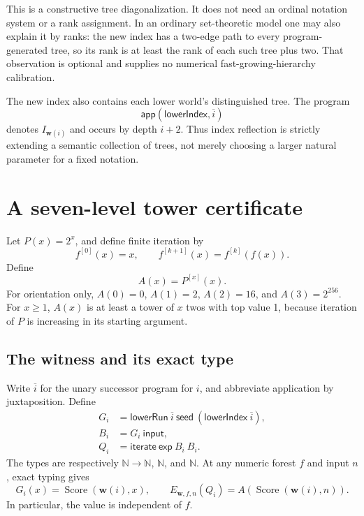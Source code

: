 \documentclass[11pt]{article}
\theoremstyle{definition}
\theoremstyle{remark}
\newcommand{\N}{\mathbb N}
\newcommand{\Score}{\operatorname{Score}}
\newcommand{\funiter}[2]{#1^{[#2]}}
\newcommand{\ctx}{\boldsymbol w}
\begin{document}
This is a constructive tree diagonalization. It does not need an ordinal
notation system or a rank assignment. In an ordinary set-theoretic model one
may also explain it by ranks: the new index has a two-edge path to every
program-generated tree, so its rank is at least the rank of each such tree
plus two. That observation is optional and supplies no numerical
fast-growing-hierarchy calibration.

The new index also contains each lower world's distinguished tree. The
program
\[
             \mathsf{app}(\mathsf{lowerIndex},\overline i)
\]
denotes $I_{\ctx(i)}$ and occurs by depth $i+2$. Thus index reflection is
strictly extending a semantic collection of trees, not merely choosing a
larger natural parameter for a fixed notation.

\section{A seven-level tower certificate}\label{sec:tower}

Let $P(x)=2^x$, and define finite iteration by
\[
 \funiter f0(x)=x,\qquad
 \funiter f{k+1}(x)=\funiter f{k}(f(x)).
\]
Define
\begin{equation}\label{eq:A}
                         A(x)=\funiter P{x}(x).
\end{equation}
For orientation only, $A(0)=0$, $A(1)=2$, $A(2)=16$, and $A(3)=2^{256}$.
For $x\ge1$, $A(x)$ is at least a tower of $x$ twos with top value 1, because
iteration of $P$ is increasing in its starting argument.

\subsection{The witness and its exact type}

Write $\overline i$ for the unary successor program for $i$, and abbreviate
application by juxtaposition. Define
\begin{align*}
 G_i&=\mathsf{lowerRun}\ \overline i\ \mathsf{seed}\
                          (\mathsf{lowerIndex}\ \overline i),\\
 B_i&=G_i\ \mathsf{input},\\
 Q_i&=\mathsf{iterate}\ \mathsf{exp}\ B_i\ B_i.
\end{align*}
The types are respectively $\N\to\N$, $\N$, and $\N$. At any numeric forest
$f$ and input $n$, exact typing gives
\begin{equation}\label{eq:witness}
 G_i(x)=\Score(\ctx(i),x),\qquad
 E_{\ctx,f,n}(Q_i)=A(\Score(\ctx(i),n)).
\end{equation}
In particular, the value is independent of $f$.
\end{document}
